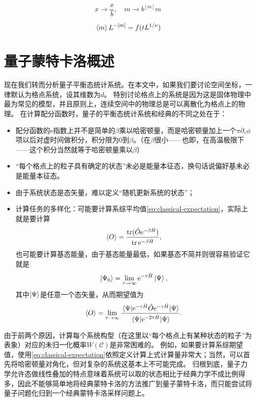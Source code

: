 \documentclass[hyperref, UTF8, a4paper]{ctexart}
\newcommand*{\ee}{\mathrm{e}}
\begin{document}
\[
    x \longrightarrow \frac{x}{b}, \quad m \longrightarrow b^{[m]} m
\]

\[
    \expval*{m} L^{-[m]} = f (t L^{1/\nu})
\]

\section{量子蒙特卡洛概述}

现在我们转而分析量子平衡态统计系统。在本文中，如果我们要讨论空间坐标，一律默认为格点系统，设其维数为$d$。
特别讨论格点上的系统是因为这是固体物理中最为常见的模型，并且原则上，连续空间中的物理总是可以离散化为格点上的物理。
在计算配分函数时，量子的平衡态统计系统和经典的不同之处在于：
\begin{itemize}
    \item 配分函数的$\ee$指数上并不是简单的$\beta$乘以哈密顿量，而是哈密顿量加上一个$\pi \partial_\tau \phi$项以后对虚时间做积分，积分限为$0$到$\beta$。（在$\beta$很小——也即，在高温极限下——这个积分当然就等于哈密顿量乘以$\beta$）
    \item “每个格点上的粒子具有确定的状态”未必是能量本征态，换句话说偏好基未必是能量本征态。
    \item 由于系统状态是态矢量，难以定义“随机更新系统的状态”；
    \item 计算任务的多样化：可能要计算系综平均值\eqref{eq:classical-expectation}，实际上就是要计算
    \begin{equation}
        \expval{O} = \frac{\trace(\hat{O} \ee^{-\beta \hat{H}})}{\trace \ee^{-\beta \hat{H}}},
        \label{eq:quantum-expectation}
    \end{equation}
    也可能要计算基态能量，由于基态能量最低，如果基态不简并则很容易验证它就是
    \begin{equation}
        \ket{\Psi_0} = \lim_{\tau \to \infty} \ee^{-\tau \hat{H}} \ket{\Psi},
        \label{eq:ground-state-infty}
    \end{equation}
    其中$\ket{\Psi}$是任意一个态矢量，从而期望值为
    \begin{equation}
        \expval{O} = \lim_{\tau \to \infty} \frac{\mel{\Psi}{\ee^{-\tau \hat{H}} \hat{O} \ee^{-\tau \hat{H}}}{\Psi}}{\mel{\Psi}{\ee^{-2\tau \hat{H}}}{\Psi}}.
    \end{equation}
\end{itemize}
由于前两个原因，计算每个系统构型（在这里以“每个格点上有某种状态的粒子”为表象）对应的未归一化概率$W(\mathcal{C})$是非常困难的。
例如，如果要计算系综期望值，使用\eqref{eq:classical-expectation}依照定义计算上式计算量非常大；当然，可以首先将哈密顿量对角化，但对复杂的系统这基本上不可能完成。
归根到底，量子力学允许态做线性叠加的特点意味着系统可以取的状态相比于经典力学不成比例得多，因此不能够简单地将经典蒙特卡洛的方法推广到量子蒙特卡洛，而只能尝试将量子问题化归到一个经典蒙特卡洛采样问题上。
\end{document}

